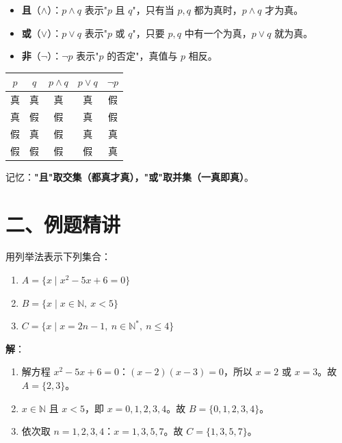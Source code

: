 \documentclass[12pt, a4paper]{ctexart}
\begin{document}
\begin{knowledgebox}[逻辑联结词]
\begin{itemize}[leftmargin=2em]
  \item \textbf{且}（$\wedge$）：$p \wedge q$ 表示"$p$ 且 $q$"，只有当 $p, q$ 都为真时，$p \wedge q$ 才为真。
  \item \textbf{或}（$\vee$）：$p \vee q$ 表示"$p$ 或 $q$"，只要 $p, q$ 中有一个为真，$p \vee q$ 就为真。
  \item \textbf{非}（$\neg$）：$\neg p$ 表示"$p$ 的否定"，真值与 $p$ 相反。
\end{itemize}
\end{knowledgebox}

\begin{knowledgebox}[真值表]
\begin{center}
\renewcommand{\arraystretch}{1.3}
\begin{tabular}{cc|ccc}
\toprule
$p$ & $q$ & $p \wedge q$ & $p \vee q$ & $\neg p$ \\
\midrule
真 & 真 & 真 & 真 & 假 \\
真 & 假 & 假 & 真 & 假 \\
假 & 真 & 假 & 真 & 真 \\
假 & 假 & 假 & 假 & 真 \\
\bottomrule
\end{tabular}
\end{center}
记忆：\textbf{"且"取交集（都真才真），"或"取并集（一真即真）}。
\end{knowledgebox}

\section*{\textcolor{examorange}{二、例题精讲}}

\begin{examplebox}[【例1】集合的表示方法转换]
用列举法表示下列集合：
\begin{enumerate}[label=(\arabic*)]
  \item $A = \{x \mid x^2 - 5x + 6 = 0\}$
  \item $B = \{x \mid x \in \mathbb{N},\ x < 5\}$
  \item $C = \{x \mid x = 2n - 1,\ n \in \mathbb{N}^*,\ n \leq 4\}$
\end{enumerate}
\end{examplebox}

\textbf{解}：
\begin{enumerate}[label=(\arabic*)]
  \item 解方程 $x^2 - 5x + 6 = 0$：$(x-2)(x-3) = 0$，所以 $x = 2$ 或 $x = 3$。故 $A = \{2, 3\}$。
  \item $x \in \mathbb{N}$ 且 $x < 5$，即 $x = 0, 1, 2, 3, 4$。故 $B = \{0, 1, 2, 3, 4\}$。
  \item 依次取 $n = 1, 2, 3, 4$：$x = 1, 3, 5, 7$。故 $C = \{1, 3, 5, 7\}$。
\end{enumerate}
\end{document}
